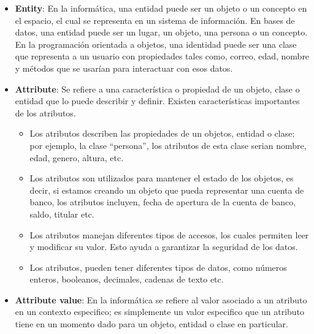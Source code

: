 \documentclass[letterpaper, 12pt]{report}
\begin{document}
\begin{itemize}[label=$\triangleright$]
	\item \textbf{Entity}: En la informática, una entidad puede ser un objeto
	      o un concepto en el espacio, el cual se representa en un sistema
	      de información. En bases de datos, una entidad puede ser un lugar,
	      un objeto, una persona o un concepto. En la programación orientada a
	      objetos, una identidad puede ser una clase que representa a un usuario
	      con propiedades tales como, correo, edad, nombre y métodos que se
	      usarían para interactuar con esos datos.

	      \nocite{Unir_2023}

	\item \textbf{Attribute}: Se refiere a una característica o
	      propiedad de un objeto, clase o entidad que lo puede describir
	      y definir. Existen características importantes de los atributos.

	      \nocite{Unir_2023}

	      \begin{itemize}
		      \item Los atributos describen las propiedades de un objetos,
		            entidad o clase; por ejemplo, la clase “persona”, los
		            atributos de esta clase serian nombre, edad, genero, altura, etc.

		      \item Los atributos son utilizados para mantener el
		            estado de los objetos, es decir, si estamos creando un objeto
		            que pueda representar una cuenta de banco, los atributos
		            incluyen, fecha de apertura de la cuenta de banco,
		            saldo, titular etc.

		      \item Los atributos manejan diferentes tipos de accesos,
		            los cuales permiten leer y modificar su valor. Esto ayuda
		            a garantizar la seguridad de los datos.

		      \item Los atributos, pueden tener diferentes tipos de datos,
		            como números enteros, booleanos, decimales, cadenas
		            de texto etc.
	      \end{itemize}


	\item \textbf{Attribute value}: En la informática se refiere
	      al valor asociado a un atributo en un contexto especifico; es
	      simplemente un valor especifico que un atributo tiene en un
	      momento dado para un objeto, entidad o clase en particular.


\end{itemize}
\end{document}
